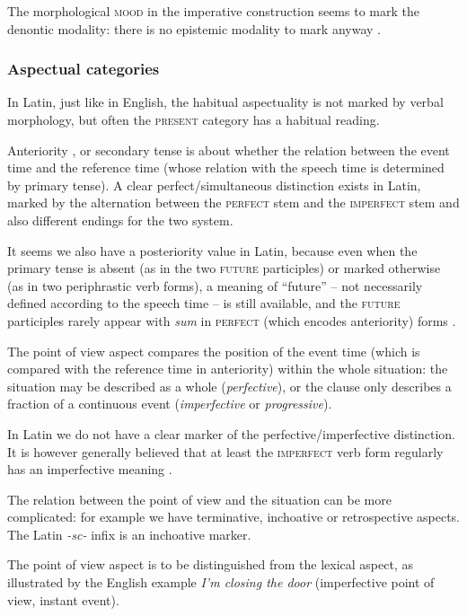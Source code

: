 \documentclass[a4paper, oneside, 12pt]{report}
\newcommand*{\citetable}[1]{Table~{#1}}
\newcommand*{\citepage}[1]{p.~{#1}}
\newcommand*{\citepages}[1]{pp.~{#1}}
\newcommand*{\term}[1]{\emph{#1}}
\newcommand{\form}[1]{\emph{#1}}
\newcommand*{\category}[1]{\textsc{#1}}
\begin{document}
The morphological \category{mood} in the imperative construction
seems to mark the denontic modality:
there is no epistemic modality to mark anyway
\citep[\citepage{388}]{Pinkster1}.

\subsubsection{Aspectual categories}

In Latin, just like in English,
the habitual aspectuality is not marked by verbal morphology,
but often the \category{present} category has a habitual reading.

Anteriority \citep[\citepages{81-83}]{cinque1999adverbs},
or secondary tense \citep[\citepages{139-140}]{cgel} is about whether the relation between the event time and the reference time 
(whose relation with the speech time is determined by primary tense).
A clear perfect/simultaneous distinction exists in Latin, marked by the alternation between 
the \category{perfect} stem and the \category{imperfect} stem and also different endings for the two system.

It seems we also have a posteriority value in Latin,
because even when the primary tense is absent 
(as in the two \category{future} participles)
or marked otherwise (as in two periphrastic verb forms),
a meaning of ``future'' -- not necessarily defined according to the speech time --
is still available,
and the \category{future} participles rarely appear
with \form{sum} in \category{perfect} (which encodes anteriority) forms
\citep[\citetable{7.3}]{Pinkster1}.

The point of view aspect compares the position of the event time
(which is compared with the reference time in anteriority)
within the whole situation:
the situation may be described as a whole (\term{perfective}),
or the clause only describes a fraction of a continuous event 
(\term{imperfective} or \term{progressive}).

In Latin we do not have a clear marker of the perfective/imperfective distinction.
It is however generally believed that at least the \category{imperfect} verb form regularly has an imperfective meaning \citep[\citepage{380}]{Pinkster1}.

The relation between the point of view and the situation can be more complicated:
for example we have terminative, inchoative or retrospective aspects.
The Latin \form{-sc-} infix is an inchoative marker.

The point of view aspect is to be distinguished from the lexical aspect,
as illustrated by the English example \form{I'm closing the door}
(imperfective point of view, instant event).
\end{document}
